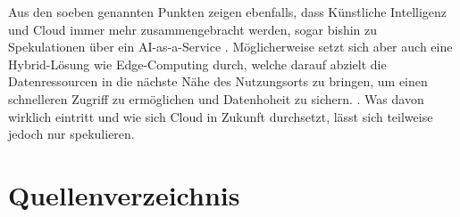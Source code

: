 \documentclass[12pt,bibtotoc]{article}
\newcounter{romanBeginningEnd} %
\begin{document}
		Aus den soeben genannten Punkten zeigen ebenfalls, dass Künstliche Intelligenz und Cloud immer mehr zusammengebracht werden, sogar bishin zu Spekulationen über ein AI-as-a-Service \cite{LuckyCloud-Artikel.2024}.
		Möglicherweise setzt sich aber auch eine Hybrid-Lösung wie Edge-Computing durch, welche darauf abzielt die Datenressourcen in die nächste Nähe des Nutzungsorts zu bringen, um einen schnelleren Zugriff zu ermöglichen und Datenhoheit zu sichern. \cite{Cao.2020}\cite{LuckyCloud-Artikel.2024}.
		\newline
		Was davon wirklich eintritt und wie sich Cloud in Zukunft durchsetzt, lässt sich teilweise jedoch nur spekulieren.




	
	
	\newpage
	\setcounter{page}{\theromanBeginningEnd} %
	\setcounter{secnumdepth}{0} %
	\section{Quellenverzeichnis}
	\setcounter{secnumdepth}{3} %
	\printbibliography[heading=none]
	\newpage
	\appendix
	\clearpage
	
\end{document}
